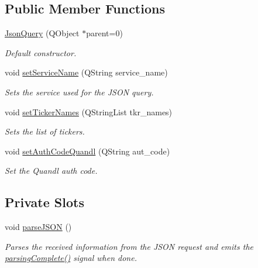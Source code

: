 \subsection*{Public Member Functions}
\begin{DoxyCompactItemize}
\item 
\hyperlink{class_json_query_a8ea4951a7e633564dd0b3fa09dc9ddec}{Json\+Query} (Q\+Object $\ast$parent=0)
\begin{DoxyCompactList}\small\item\em Default constructor. \end{DoxyCompactList}\item 
void \hyperlink{class_json_query_a173751689d3ecc26d34a2673b83191f6}{set\+Service\+Name} (Q\+String service\+\_\+name)
\begin{DoxyCompactList}\small\item\em Sets the service used for the J\+S\+O\+N query. \end{DoxyCompactList}\item 
void \hyperlink{class_json_query_a79acc90e20082bdfc6ab72a4c2444b26}{set\+Ticker\+Names} (Q\+String\+List tkr\+\_\+names)
\begin{DoxyCompactList}\small\item\em Sets the list of tickers. \end{DoxyCompactList}\item 
void \hyperlink{class_json_query_afefa6f2e54d664970c0b4ba1d041606c}{set\+Auth\+Code\+Quandl} (Q\+String aut\+\_\+code)
\begin{DoxyCompactList}\small\item\em Set the Quandl auth code. \end{DoxyCompactList}\end{DoxyCompactItemize}
\subsection*{Private Slots}
\begin{DoxyCompactItemize}
\item 
\hypertarget{class_json_query_ad6bddcda7bd4af909e45bd2ca392b275}{void \hyperlink{class_json_query_ad6bddcda7bd4af909e45bd2ca392b275}{parse\+J\+S\+O\+N} ()}\label{class_json_query_ad6bddcda7bd4af909e45bd2ca392b275}

\begin{DoxyCompactList}\small\item\em Parses the received information from the J\+S\+O\+N request and emits the \hyperlink{class_json_query_a384e9fd610b9046695a1f1f12e7e3ba6}{parsing\+Complete()} signal when done. \end{DoxyCompactList}\end{DoxyCompactItemize}
